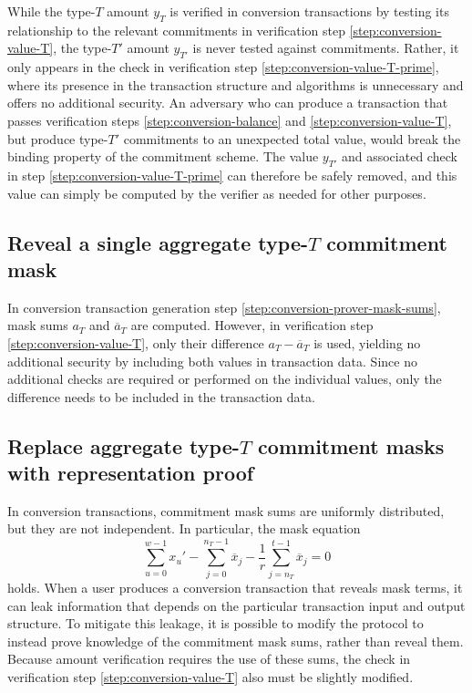 \documentclass{article}
\begin{document}
While the type-$T$ amount $y_T$ is verified in conversion transactions by testing its relationship to the relevant commitments in verification step \ref{step:conversion-value-T}, the type-$T'$ amount $y_{T'}$ is never tested against commitments.
Rather, it only appears in the check in verification step \ref{step:conversion-value-T-prime}, where its presence in the transaction structure and algorithms is unnecessary and offers no additional security.
An adversary who can produce a transaction that passes verification steps \ref{step:conversion-balance} and \ref{step:conversion-value-T}, but produce type-$T'$ commitments to an unexpected total value, would break the binding property of the commitment scheme.
The value $y_{T'}$ and associated check in step \ref{step:conversion-value-T-prime} can therefore be safely removed, and this value can simply be computed by the verifier as needed for other purposes.


\subsection{Reveal a single aggregate type-\texorpdfstring{$T$}{T} commitment mask}
\label{rec:single-mask}

In conversion transaction generation step \ref{step:conversion-prover-mask-sums}, mask sums $a_T$ and $\overline{a}_T$ are computed.
However, in verification step \ref{step:conversion-value-T}, only their difference $a_T - \overline{a}_T$ is used, yielding no additional security by including both values in transaction data.
Since no additional checks are required or performed on the individual values, only the difference needs to be included in the transaction data.


\subsection{Replace aggregate type-\texorpdfstring{$T$}{T} commitment masks with representation proof}
\label{rec:zk-masks-T}

In conversion transactions, commitment mask sums are uniformly distributed, but they are not independent.
In particular, the mask equation
$$\sum_{u=0}^{w-1} x_u' - \sum_{j=0}^{n_T-1} \overline{x}_j - \frac{1}{r}\sum_{j=n_T}^{t-1} \overline{x}_j = 0$$
holds.
When a user produces a conversion transaction that reveals mask terms, it can leak information that depends on the particular transaction input and output structure.
To mitigate this leakage, it is possible to modify the protocol to instead prove knowledge of the commitment mask sums, rather than reveal them.
Because amount verification requires the use of these sums, the check in verification step \ref{step:conversion-value-T} also must be slightly modified.
\end{document}

